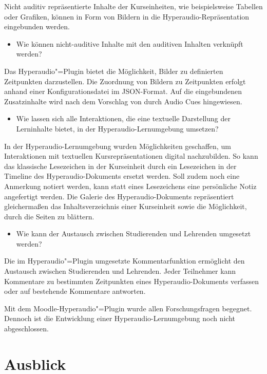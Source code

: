 Nicht auditiv repräsentierte Inhalte der Kurseinheiten, wie beispielsweise Tabellen oder Grafiken, können in Form von Bildern in die Hyperaudio-Repräsentation eingebunden werden.

\begin{itemize}
\item Wie können nicht-auditive Inhalte mit den auditiven Inhalten verknüpft werden?
\end{itemize}

Das Hyperaudio"=Plugin bietet die Möglichkeit, Bilder zu definierten Zeitpunkten darzustellen. Die Zuordnung von Bildern zu Zeitpunkten erfolgt anhand einer Konfigurationsdatei im JSON-Format. Auf die eingebundenen Zusatzinhalte wird nach dem Vorschlag von \cite{donker2007gestaltung} durch Audio Cues hingewiesen.

\begin{itemize}
\item Wie lassen sich alle Interaktionen, die eine textuelle Darstellung der Lerninhalte bietet, in der Hyperaudio-Lernumgebung umsetzen?
\end{itemize}

In der Hyperaudio-Lernumgebung wurden Möglichkeiten geschaffen, um Interaktionen mit textuellen Kursrepräsentationen digital nachzubilden. So kann das klassische Lesezeichen in der Kurseinheit durch ein Lesezeichen in der Timeline des Hyperaudio-Dokuments ersetzt werden. Soll zudem noch eine Anmerkung notiert werden, kann statt eines Lesezeichens eine persönliche Notiz angefertigt werden. Die Galerie des Hyperaudio-Dokuments repräsentiert gleichermaßen das Inhaltsverzeichnis einer Kurseinheit sowie die Möglichkeit, durch die Seiten zu blättern.

\begin{itemize}
\item Wie kann der Austausch zwischen Studierenden und Lehrenden umgesetzt werden?
\end{itemize}
Die im Hyperaudio"=Plugin umgesetzte Kommentarfunktion ermöglicht den Austausch zwischen Studierenden und Lehrenden. Jeder Teilnehmer kann Kommentare zu bestimmten Zeitpunkten eines Hyperaudio-Dokuments verfassen oder auf bestehende Kommentare antworten.

Mit dem Moodle-Hyperaudio"=Plugin wurde allen Forschungsfragen begegnet. Dennoch ist die Entwicklung einer Hyperaudio-Lernumgebung noch nicht abgeschlossen.

\section{Ausblick}

